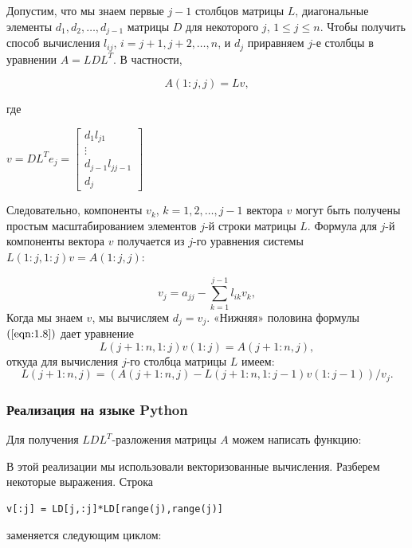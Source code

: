\documentclass[a4paper]{article}
\begin{document}
Допустим, что мы знаем первые \(j-1\) столбцов матрицы \(L\),
диагональные элементы \(d_1, d_2, \ldots, d_{j-1}\) матрицы \(D\) для
некоторого \(j\), \(1 \leq j \leq n\). Чтобы получить способ вычисления
\(l_{ij}\), \(i = j+1, j+2, \ldots, n\), и \(d_j\) приравняем \(j\)-е
столбцы в уравнении \(A = LDL^T\). В частности,

\begin{equation}
    \label{eqn:1.8}
    A(1:j,j) = Lv,
\end{equation}

где
\begin{center}
 $v = DL^T e_j = \begin{bmatrix}
   d_1 l_{j1}\\
   \vdots \\
   d_{j-1} l_{jj-1}\\
   d_j
   \end{bmatrix}$
\end{center}

Следовательно, компоненты \(v_k\), \(k = 1, 2, \ldots, j-1\) вектора
\(v\) могут быть получены простым масштабированием элементов \(j\)-й
строки матрицы \(L\). Формула для \(j\)-й компоненты вектора \(v\)
получается из \(j\)-го уравнения системы \(L(1:j, 1:j) v = A(1:j, j)\):

\[
   v_j = a_{jj} - \sum_{k = 1}^{j-1} l_{ik}v_k,
\] Когда мы знаем \(v\), мы вычисляем \(d_j = v_j\). «Нижняя» половина
формулы $(\ref{eqn:1.8})$ дает уравнение \[
   L(j+1:n, 1:j) v(1:j) = A(j+1:n, j),
\] откуда для вычисления \(j\)-го столбца матрицы \(L\) имеем: \[
   L(j+1:n, j) = (A(j+1:n,j) - L(j+1:n, 1:j-1)v(1:j-1))/v_j.
\]

\subsubsection{Реализация на языке Python}

Для получения \(LDL^T\)-разложения матрицы \(A\) можем написать функцию:



В этой реализации мы использовали векторизованные вычисления. Разберем
некоторые выражения. Строка

\begin{verbatim}
v[:j] = LD[j,:j]*LD[range(j),range(j)]
\end{verbatim}

заменяется следующим циклом:
\end{document}

